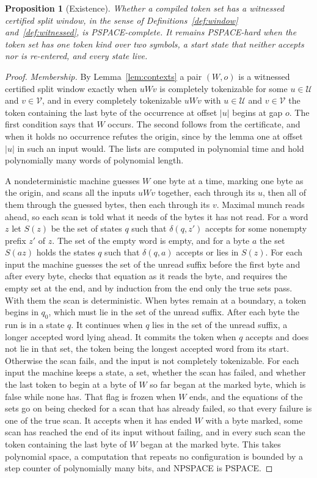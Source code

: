 \documentclass[11pt,a4paper]{article}
\theoremstyle{definition}
\theoremstyle{plain}
\newtheorem{proposition}{Proposition}
\begin{document}
\begin{proposition}[Existence]
\label{prop:existence}
Whether a compiled token set has a witnessed certified split window, in the sense of Definitions~\ref{def:window}
and~\ref{def:witnessed}, is PSPACE-complete. It remains PSPACE-hard when the token set has one token kind over two
symbols, a start state that neither accepts nor is re-entered, and every state live.
\end{proposition}

\begin{proof}
\emph{Membership.} By Lemma~\ref{lem:contexts} a pair $(W, o)$ is a witnessed certified split window exactly when
$u W v$ is completely tokenizable for some $u \in \mathcal{U}$ and $v \in \mathcal{V}$, and in every completely
tokenizable $u W v$ with $u \in \mathcal{U}$ and $v \in \mathcal{V}$ the token containing the last byte of the
occurrence at offset $|u|$ begins at gap $o$. The first condition says that $W$ occurs. The second follows from the
certificate, and when it holds no occurrence refutes the origin, since by the lemma one at offset $|u|$ in such an input
would. The lists are computed in polynomial time and hold polynomially many words of polynomial length.

A nondeterministic machine guesses $W$ one byte at a time, marking one byte as the origin, and scans all the inputs
$u W v$ together, each through its $u$, then all of them through the guessed bytes, then each through its $v$. Maximal
munch reads ahead, so each scan is told what it needs of the bytes it has not read. For a word $z$ let $S(z)$ be the set
of states $q$ such that $\delta(q, z')$ accepts for some nonempty prefix $z'$ of $z$. The set of the empty word is
empty, and for a byte $a$ the set $S(a z)$ holds the states $q$ such that $\delta(q, a)$ accepts or lies in $S(z)$. For
each input the machine guesses the set of the unread suffix before the first byte and after every byte, checks that
equation as it reads the byte, and requires the empty set at the end, and by induction from the end only the true sets
pass. With them the scan is deterministic. When bytes remain at a boundary, a token begins in $q_0$, which must lie in
the set of the unread suffix. After each byte the run is in a state $q$. It continues when $q$ lies in the set of the
unread suffix, a longer accepted word lying ahead. It commits the token when $q$ accepts and does not lie in that set,
the token being the longest accepted word from its start. Otherwise the scan fails, and the input is not completely
tokenizable. For each input the machine keeps a state, a set, whether the scan has failed, and whether the last token to
begin at a byte of $W$ so far began at the marked byte, which is false while none has. That flag is frozen when $W$
ends, and the equations of the sets go on being checked for a scan that has already failed, so that every failure is one
of the true scan. It accepts when it has ended $W$ with a byte marked, some scan has reached the end of its input
without failing, and in every such scan the token containing the last byte of $W$ began at the marked byte. This takes
polynomial space, a computation that repeats no configuration is bounded by a step counter of polynomially many bits,
and NPSPACE is PSPACE.


\end{proof}
\end{document}
